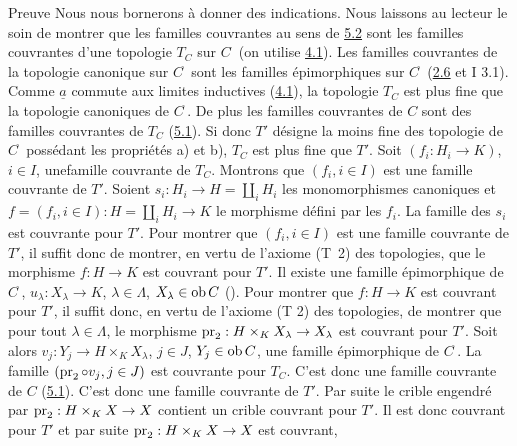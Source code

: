 \documentclass[10pt]{../fichiers-configuration-latex/smfart}
\begin{document}
\begin{enonce*}[remark]{Preuve}
Nous nous bornerons à donner des indications. Nous laissons au
lecteur le soin de montrer que les familles couvrantes au sens de
\hyperref[II.def5.2]{5.2} sont les familles couvrantes d'une topologie $T_C$
sur $C^{\widehat{\phantom{,}}}$ (on utilise \hyperref[II.theo4.1]{4.1}). Les
familles couvrantes de la topologie canonique sur
$C^{\widehat{\phantom{,}}}$ sont les familles épimorphiques sur
$C^{\widehat{\phantom{,}}}$ (\hyperref[II.prop2.6]{2.6} et I 3.1). Comme
$\underline{a}$ commute aux limites inductives (\hyperref[II.theo4.1]{4.1}), la
topologie $T_C$ est plus fine que la topologie canoniques de
$C^{\widehat{\phantom{,}}}$. De plus les familles couvrantes de $C$
sont des familles couvrantes de $T_C$ (\hyperref[II.prop5.1]{5.1}). Si donc
$T'$ désigne la moins fine des topologie de
$C^{\widehat{\phantom{,}}}$ possédant les propriétés a) et b), $T_C$
est plus fine que $T'$. Soit $(f_i:H_i\rightarrow K)$, $i\in I$,
une\pageoriginale famille couvrante de $T_C$. Montrons que
$(f_i,i\in I)$ est une famille couvrante de $T'$. Soient
$s_i:H_i\rightarrow H=\amalg_i H_i$ les monomorphismes canoniques et
$f=(f_i,i\in I):H=\amalg_i H_i\rightarrow K$ le morphisme défini par
les $f_i$. La famille des $s_i$ est couvrante pour $T'$. Pour
montrer que $(f_i,i\in I)$ est une famille couvrante de $T'$, il
suffit donc de montrer, en vertu de l'axiome (T~2) des topologies,
que le morphisme $f:H\rightarrow K$ est couvrant pour $T'$. Il
existe une famille épimorphique de $C^{\widehat{\phantom{,}}}$,
$u_{\lambda}:X_{\lambda}\rightarrow K$, $\lambda\in \Lambda$,
$X_{\lambda}\in \operatorname{ob} C$ (). Pour montrer que
$f:H\rightarrow K$ est couvrant pour $T'$, il suffit donc, en vertu
de l'axiome (T 2) des topologies, de montrer que pour tout
$\lambda\in \Lambda$, le morphisme $\operatorname{pr}_2:H\times_K
X_{\lambda}\rightarrow X_{\lambda}$ est couvrant pour $T'$. Soit
alors $v_j:Y_j\rightarrow H\times_K X_{\lambda}$, $j\in J$, $Y_j\in
\operatorname{ob} C$, une famille épimorphique de $C^{\widehat{\phantom{,}}}$. La
famille $(\operatorname{pr}_2\circ v_j, j\in J)$ est couvrante pour $T_{C}$. C'est
donc une famille couvrante de $C$ (\hyperref[II.prop5.1]{5.1}). C'est donc une
famille couvrante de $T'$. Par suite le crible engendré par
$\operatorname{pr}_2:H\times_K X\rightarrow X$ contient un crible couvrant pour
$T'$. Il est donc couvrant pour $T'$ et par suite $\operatorname{pr}_2:H\times_K
X\rightarrow X$ est couvrant, \cqfd
\end{enonce*}
\end{document}
